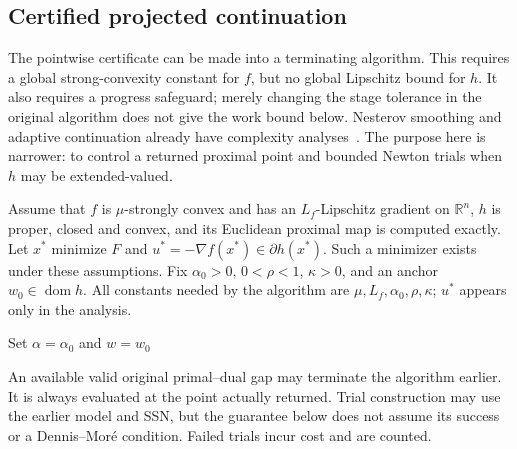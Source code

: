 \subsection{Certified projected continuation}\label{sec:certified-continuation}
The pointwise certificate can be made into a terminating algorithm. This requires a global strong-convexity constant for $f$, but no global Lipschitz bound for $h$. It also requires a progress safeguard; merely changing the stage tolerance in the original algorithm does not give the work bound below. Nesterov smoothing and adaptive continuation already have complexity analyses~\cite{nesterov2005smooth,trandinh2016adaptive,zheng2016continuation}. The purpose here is narrower: to control a returned proximal point and bounded Newton trials when $h$ may be extended-valued.

Assume that $f$ is $\mu$-strongly convex and has an $L_f$-Lipschitz gradient on $\mathbb R^n$, $h$ is proper, closed and convex, and its Euclidean proximal map is computed exactly. Let $x^*$ minimize $F$ and $u^*=-\nabla f(x^*)\in\partial h(x^*)$. Such a minimizer exists under these assumptions. Fix $\alpha_0>0$, $0<\rho<1$, $\kappa>0$, and an anchor $w_0\in\operatorname{dom}h$. All constants needed by the algorithm are $\mu,L_f,\alpha_0,\rho,\kappa$; $u^*$ appears only in the analysis.

\begin{algorithm}[H]
\caption{Safeguarded projected continuation (P-CONT)}\label{alg:pcont}
Set $\alpha=\alpha_0$ and $w=w_0$\;
\end{algorithm}
An available valid original primal--dual gap may terminate the algorithm earlier. It is always evaluated at the point actually returned. Trial construction may use the earlier model and SSN, but the guarantee below does not assume its success or a Dennis--Mor\'e condition. Failed trials incur cost and are counted.

